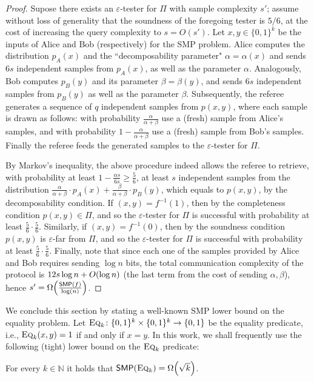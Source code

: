 \documentclass[11pt]{article}
\theoremstyle{remark}   	\newtheorem{remark}[theorem]{Remark}
\theoremstyle{definition}   	\newaliascnt{defn}{theorem}
\newcommand{\eps}{\ensuremath{\varepsilon}\xspace}
\newcommand{\bigO}[1]{{O\mleft( #1 \mright)}}
\newcommand{\bigOmega}[1]{{\Omega\mleft( #1 \mright)}}
\newcommand{\N}{\ensuremath{\mathbb{N}}\xspace}
\newcommand{\bitset}{\ensuremath{\{0,1\}}}
\newcommand{\SMP}{\ensuremath{\mathsf{SMP}}}
\newcommand{\EQ}[1][n]{\textsc{Eq}_{#1}}
\begin{document}
\begin{proof}
Supose there exists an $\eps$-tester for $\Pi$ with sample complexity $s'$; assume without loss of generality that the soundness of the foregoing tester is $5/6$, at the cost of increasing the query complexity to $s=O(s')$. Let $x,y\in\bitset^k$ be the inputs of Alice and Bob (respectively) for the SMP problem. Alice computes the distribution $p_A(x)$ and the ``decomposability parameter" $\alpha=\alpha(x)$ and sends $6 s$  independent samples from $p_A(x)$, as well as the parameter $\alpha$. Analogously, Bob computes $p_B(y)$ and its parameter $\beta=\beta(y)$, and sends $6s$ independent samples from $p_B(y)$ as well as the parameter $\beta$. Subsequently, the referee generates a sequence of $q$ independent samples from $p(x,y)$, where each sample is drawn as follows: with probability $\frac{\alpha}{\alpha+\beta}$ use a (fresh) sample from Alice's samples, and with probability $1-\frac{\alpha}{\alpha+\beta}$ use a (fresh) sample from Bob's samples. Finally the referee feeds the generated samples to the $\eps$-tester for $\Pi$.

By Markov's inequality, the above procedure indeed allows the referee to retrieve, with probability at least $1-\frac{\alpha s}{6 s}\geq\frac{5}{6}$, at least $s$ independent samples from the distribution $\frac{\alpha}{\alpha+\beta}\cdot p_A(x) + \frac{\beta}{\alpha+\beta}\cdot p_B(y)$, which equals to $p(x,y)$, by the decomposability condition. If $(x,y) = f^{-1}(1)$, then by the completeness condition $p(x,y) \in \Pi$, and so the $\eps$-tester for $\Pi$ is successful with probability at least $\frac56 \cdot \frac 56$. Similarly, if $(x,y) = f^{-1}(0)$, then by the soundness condition $p(x,y)$ is $\eps$-far from $\Pi$, and so the $\eps$-tester for $\Pi$ is successful with probability at least $\frac56 \cdot \frac 56$. Finally, note that since each one of the samples provided by Alice and Bob requires sending $\log n$ bits, the total communication complexity of the protocol is $12s\log n + \bigO{\log n}$ (the last term from the cost of sending $\alpha,\beta$), hence $s' = \bigOmega{\frac{\SMP(f)}{\log(n)}}$.
\end{proof}

We conclude this section by stating a well-known SMP lower bound on the equality problem. Let $\EQ[k]\colon \bitset^k \times \bitset^k \to \bitset$ be the equality predicate, i.e., $\EQ[k](x,y)=1$ if and only if $x=y$. In this work, we shall frequently use the following (tight) lower bound on the $\EQ[k]$ predicate:
\begin{theorem}\label{theo:equality:smp:lb}
For every $k\in\N$ it holds that $\SMP(\EQ[k]) =\bigOmega{\sqrt{k}}$.
\end{theorem}
 
\end{document}
